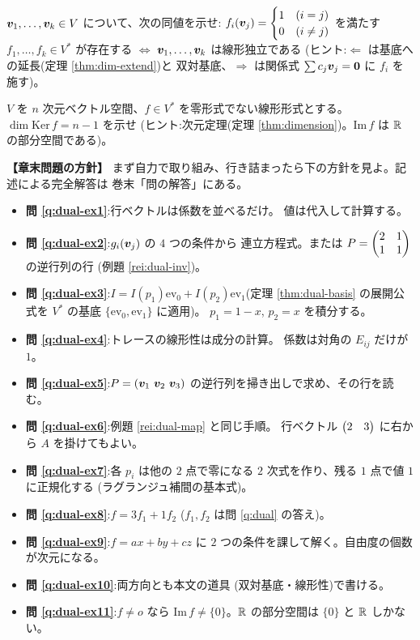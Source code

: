 \begin{mondai}[証明]\label{q:dual-ex10}
$\bm{v}_1, \dots, \bm{v}_k \in V$ について、次の同値を示せ:
$f_i(\bm{v}_j) = \begin{cases} 1 & (i = j) \\ 0 & (i \neq j)\end{cases}$
を満たす $f_1, \dots, f_k \in V^{*}$ が存在する
$\iff$ $\bm{v}_1, \dots, \bm{v}_k$ は線形独立である
(ヒント:$\Leftarrow$ は基底への延長(定理 \ref{thm:dim-extend})と
双対基底、$\Rightarrow$ は関係式 $\sum c_j \bm{v}_j = \bm{0}$ に
$f_i$ を施す)。
\end{mondai}

\begin{mondai}[証明]\label{q:dual-ex11}
$V$ を $n$ 次元ベクトル空間、$f \in V^{*}$ を零形式でない線形形式とする。
$\dim \mathrm{Ker}\,f = n - 1$ を示せ
(ヒント:次元定理(定理 \ref{thm:dimension})。$\mathrm{Im}\,f$ は
$\mathbb{R}$ の部分空間である)。
\end{mondai}

\bigskip
{\small
\noindent\textbf{【章末問題の方針】}\quad
まず自力で取り組み、行き詰まったら下の方針を見よ。記述による完全解答は
巻末「問の解答」にある。
\begin{itemize}
\item \textbf{問 \ref{q:dual-ex1}}:行ベクトルは係数を並べるだけ。
値は代入して計算する。
\item \textbf{問 \ref{q:dual-ex2}}:$g_i(\bm{v}_j)$ の $4$ つの条件から
連立方程式。または $P = \begin{pmatrix}2 & 1 \\ 1 & 1\end{pmatrix}$ の逆行列の行
(例題 \ref{rei:dual-inv})。
\item \textbf{問 \ref{q:dual-ex3}}:$I = I(p_1)\mathrm{ev}_0
+ I(p_2)\mathrm{ev}_1$(定理 \ref{thm:dual-basis} の展開公式を
$V^{*}$ の基底 $\{\mathrm{ev}_0, \mathrm{ev}_1\}$ に適用)。
$p_1 = 1 - x$, $p_2 = x$ を積分する。
\item \textbf{問 \ref{q:dual-ex4}}:トレースの線形性は成分の計算。
係数は対角の $E_{ij}$ だけが $1$。
\item \textbf{問 \ref{q:dual-ex5}}:$P = (\bm{v}_1\ \bm{v}_2\ \bm{v}_3)$
の逆行列を掃き出しで求め、その行を読む。
\item \textbf{問 \ref{q:dual-ex6}}:例題 \ref{rei:dual-map} と同じ手順。
行ベクトル $\begin{pmatrix}2 & 3\end{pmatrix}$ に右から $A$ を掛けてもよい。
\item \textbf{問 \ref{q:dual-ex7}}:各 $p_i$ は他の $2$ 点で零になる
$2$ 次式を作り、残る $1$ 点で値 $1$ に正規化する
(ラグランジュ補間の基本式)。
\item \textbf{問 \ref{q:dual-ex8}}:$f = 3f_1 + 1f_2$
($f_1, f_2$ は問 \ref{q:dual} の答え)。
\item \textbf{問 \ref{q:dual-ex9}}:$f = ax + by + cz$ に
$2$ つの条件を課して解く。自由度の個数が次元になる。
\item \textbf{問 \ref{q:dual-ex10}}:両方向とも本文の道具
(双対基底・線形性)で書ける。
\item \textbf{問 \ref{q:dual-ex11}}:$f \neq o$ なら
$\mathrm{Im}\,f \neq \{0\}$。$\mathbb{R}$ の部分空間は $\{0\}$ と $\mathbb{R}$ しかない。
\end{itemize}
}


